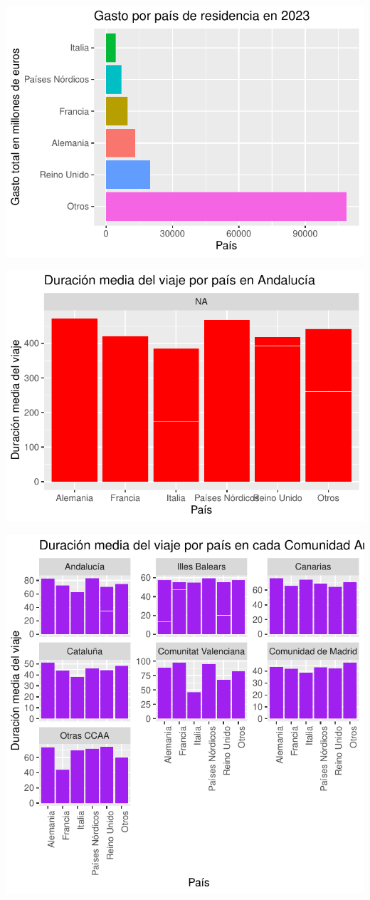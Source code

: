\documentclass[data,article,submit,moreauthors,pdftex]{Definitions/mdpi}
\begin{document}
\includegraphics{ProyectoAED2024_Rmd_files/figure-latex/unnamed-chunk-23-1}

\includegraphics{ProyectoAED2024_Rmd_files/figure-latex/unnamed-chunk-24-1}

\includegraphics{ProyectoAED2024_Rmd_files/figure-latex/unnamed-chunk-25-1}
\end{document}
